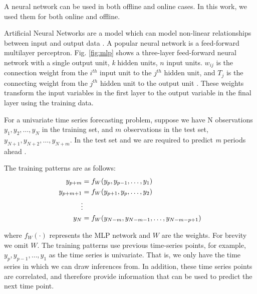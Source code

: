 \documentclass[final,3p,times,twocolumn,numbers]{elsarticle}
\begin{document}
A neural network can be used in both offline and online cases. In this work, we used them for both online and offline.

Artificial Neural Networks are a model which can model non-linear relationships between input and output data \cite{Akaike1974}. A popular neural network is a feed-forward multilayer perceptron. Fig. \ref{fig:mlp} shows a three-layer feed-forward neural network with a single output unit, \textit{k} hidden units, $n$ input units. $w_{ij}$ is the connection weight from the $i^{th}$ input unit to the $j^{th}$ hidden unit,  and $T_j$ is the connecting weight from the $j^{th}$ hidden unit to the output unit \cite{Pao2007}. These weights transform the input variables in the first layer to the output variable in the final layer using the training data. 


For a univariate time series forecasting problem, suppose we have N observations $y_1, y_2, \ldots, y_N$ in the training set, and $m$ observations in the test set, $y_{N+1}, y_{N+2}, \ldots, y_{N+m}$. In the test set and we are required to predict \textit{m} periods ahead \cite{Pao2007}. 

The training patterns are as follows:
\begin{align}
y_{p+m} & =f_{W}(y_p, y_{p-1},\ldots,y_1)\\
y_{p+m+1} & =f_{W}(y_{p+1}, y_{p},\ldots,y_2)\\
&\vdotswithin  \notag \\
y_{N} & =f_{W}(y_{N-m},y_{N-m-1},\ldots,y_{N-m-p+1})
\end{align}

\noindent where $f_{W}(\cdot)$ represents the MLP network and $W$ are the weights. For brevity we omit $W$. The training patterns use previous time-series points, for example, $y_p, y_{p-1},\ldots,y_1$ as the time series is univariate. That is, we only have the time series in which we can draw inferences from. In addition, these time series points are correlated, and therefore provide information that can be used to predict the next time point.
\end{document}
